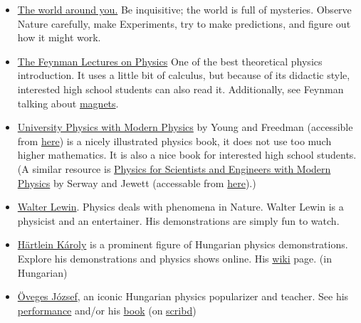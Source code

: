 \documentclass{article}
\begin{document}
\begin{itemize}

\item \underline{The world around you.} Be inquisitive; the world is full of mysteries. Observe Nature carefully, make Experiments, try to make predictions, and figure out how it might work.

\item \href{https://www.feynmanlectures.caltech.edu/}{The Feynman Lectures on Physics} One of the best theoretical physics introduction. It uses a little bit of calculus, but because of its didactic style, interested high school students can also read it. Additionally, see Feynman talking about \href{https://www.youtube.com/watch?v=MO0r930Sn_8}{magnets}.

\item \href{https://www.goodreads.com/book/show/125139.University_Physics_with_Modern_Physics}{University Physics with Modern Physics} by Young and Freedman (accessible from 
 \href{https://web.archive.org/web/20240617180331/https://raw.githubusercontent.com/sonhuytran/MIT8.01SC.2010F/master/References/University%20Physics%20with%20Modern%20Physics,%2013th%20Edition.pdf}{here}) is a nicely illustrated physics book, it does not use too much higher mathematics. It is also a nice book for interested high school students. (A similar resource is \href{https://www.goodreads.com/book/show/23196829-physics-for-scientists-and-engineers-with-modern-physics}{Physics for Scientists and Engineers with Modern Physics} by Serway and Jewett (accessable from \href{https://web.archive.org/web/20211111152634/https://powerunit-ju.com/wp-content/uploads/2019/01/Physics-Textbook-9th-E-GearTeam-ilovepdf-compressed.pdf}{here}).)

\item \href{https://www.youtube.com/channel/UCiEHVhv0SBMpP75JbzJShqw}{Walter Lewin}. Physics deals with phenomena in Nature. Walter Lewin is a physicist and an entertainer. His demonstrations are simply fun to watch. 

\item \href{http://goliat.eik.bme.hu/~hartlein/}{Härtlein Károly} is a prominent figure of Hungarian physics demonstrations. Explore his demonstrations and physics shows online. His \href{https://hu.wikipedia.org/wiki/H\%C3\%A4rtlein_K\%C3\%A1roly}{wiki} page. (in Hungarian)

\item \href{https://hu.wikipedia.org/wiki/\%C3\%96veges_J\%C3\%B3zsef}{Öveges József}, an iconic Hungarian physics popularizer and teacher. See his \href{https://videa.hu/videok/tudomany-technika/oveges-professzor-legkedvesebb-kiserleteim-1-fizika-Od5Qi64hETkOe6hM}{performance} and/or his \href{https://moly.hu/konyvek/oveges-jozsef-kiserletek-konyve}{book} (on \href{https://www.scribd.com/doc/238251897/Oveges-Jozsef-Kiserletek-Konyve}{scribd})


\end{itemize}
\end{document}
